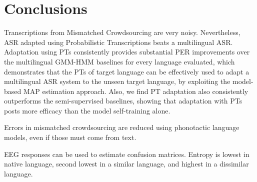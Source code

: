
\section{Conclusions}

Transcriptions from Mismatched Crowdsourcing are very noisy.
Nevertheless, ASR adapted using Probabilistic Transcriptions beats a
multilingual ASR.  Adaptation using PTs consistently provides
substantial PER improvements over the multilingual GMM-HMM baselines
for every language evaluated, which demonstrates that the PTs of
target language can be effectively used to adapt a multilingual ASR
system to the unseen target language, by exploiting the model-based
MAP estimation approach. Also, we find PT adaptation also consistently
outperforms the semi-supervised baselines, showing that adaptation
with PTs posts more efficacy than the model self-training alone.

Errors in mismatched crowdsourcing are reduced using phonotactic
language models, even if those must come from text.

EEG responses can be used to estimate confusion matrices. Entropy is
lowest in native language, second lowest in a similar language, and
highest in a dissimilar language.

